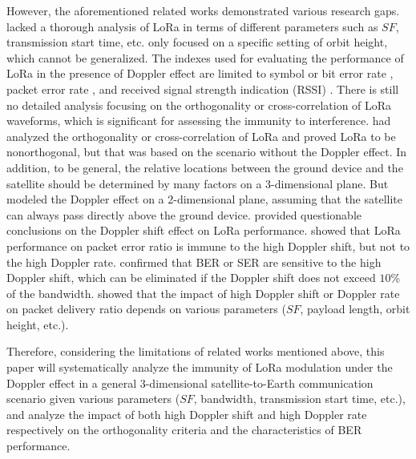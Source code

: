 \documentclass{IEEEtaes}
\theoremstyle{plain}
\begin{document}
However, the aforementioned related works demonstrated various research gaps. 
\cite{doroshkin2019experimental} lacked a thorough analysis of LoRa in terms of different parameters such as $SF$, transmission start time, etc. \cite{zadorozhny2022first} only focused on a specific setting of orbit height, which cannot be generalized. The indexes used for evaluating the performance of LoRa in the presence of Doppler effect are limited to symbol or bit error rate \cite{cao2021influence}, packet error rate \cite{colombo2022low,doroshkin2019experimental,zadorozhny2022first,ullah2023understanding}, and received signal strength indication (RSSI) \cite{lapapan2021lora}. There is still no detailed analysis focusing on the orthogonality or cross-correlation of LoRa waveforms, which is significant for assessing the immunity to interference. \cite{benkhelifa2022orthogonal,croce2017impact} had analyzed the orthogonality or cross-correlation of LoRa and proved LoRa to be nonorthogonal, but that was based on the scenario without the Doppler effect. In addition, to be general, the relative locations between the ground device and the satellite should be determined by many factors on a 3-dimensional plane. But \cite{cao2021influence,colombo2022low,ullah2023understanding} modeled the Doppler effect on a 2-dimensional plane, assuming that the satellite can always pass directly above the ground device. 
\cite{colombo2022low,ameloot2021characterizing,ullah2023understanding} provided questionable conclusions on the Doppler shift effect on LoRa performance. 
\cite{colombo2022low} showed that LoRa performance on packet error ratio is immune to the high Doppler shift, but not to the high Doppler rate. \cite{ameloot2021characterizing} confirmed that BER or SER are sensitive to the high Doppler shift, which can be eliminated if the Doppler shift does not exceed $10$\% of the bandwidth. 
\cite{ullah2023understanding} showed that the impact of high Doppler shift or Doppler rate on packet delivery ratio depends on various parameters ($SF$, payload length, orbit height, etc.).

Therefore, considering the limitations of related works mentioned above, this paper will systematically analyze the immunity of LoRa modulation under the Doppler effect in a general 3-dimensional satellite-to-Earth communication scenario given various parameters ($SF$, bandwidth, transmission start time, etc.), and analyze the impact of both high Doppler shift and high Doppler rate respectively on the orthogonality criteria and the characteristics of BER performance. 
\end{document}
